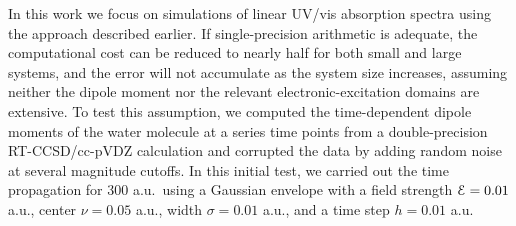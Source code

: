 In this work we focus on simulations of linear UV/vis absorption spectra using
the approach described earlier.  If single-precision arithmetic is adequate, the
computational cost can be reduced to nearly half for both small and large
systems, and the error will not accumulate as the system size increases,
assuming neither the dipole moment nor the relevant electronic-excitation
domains are extensive.  To test this assumption, we computed the time-dependent
dipole moments of the water molecule at a series time points from a
double-precision RT-CCSD/cc-pVDZ calculation and corrupted the data by adding
random noise at several magnitude cutoffs.  In this initial test, we carried out
the time propagation for 300 a.u.\ using a Gaussian envelope with a field
strength ${\cal E} = 0.01$ a.u., center $\nu = 0.05$ a.u., width $\sigma = 0.01$
a.u., and a time step $h = 0.01$ a.u.

